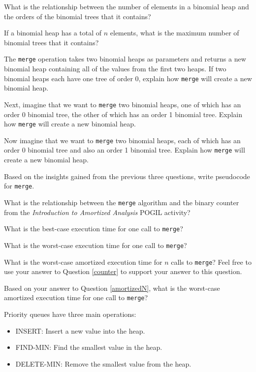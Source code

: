\documentclass{tufte-handout}
\begin{document}
\begin{questions}
\item What is the relationship between the number of elements in a binomial heap and the orders of the binomial trees that it contains?

\item If a binomial heap has a total of $n$ elements, what is the maximum number of binomial trees that it contains? 

\item The \verb|merge| operation takes two binomial heaps as parameters and returns a new binomial heap containing all of the values from the first two heaps. If two binomial heaps each have one tree of order 0, explain how \verb|merge| will create a new binomial heap.

\item Next, imagine that we want to \verb|merge| two binomial heaps, one of which has an order 0 binomial tree, the other of which has an order 1 binomial tree. Explain how \verb|merge| will create a new binomial heap.

\item Now imagine that we want to \verb|merge| two binomial heaps, each of which has an order 0 binomial tree and also an order 1 binomial tree. Explain how \verb|merge| will create a new binomial heap.

\item Based on the insights gained from the previous three questions, write pseudocode for \verb|merge|.

\item What is the relationship between the \verb|merge| algorithm and the binary counter from the \emph{Introduction to Amortized Analysis} POGIL activity? \label{counter}

\item What is the best-case execution time for one call to \verb|merge|?

\item What is the worst-case execution time for one call to \verb|merge|?

\item What is the worst-case amortized execution time for $n$ calls to \verb|merge|? Feel free to use your answer to Question \ref{counter} to support your answer to this question. \label{amortizedN}

\item Based on your answer to Question \ref{amortizedN}, what is the worst-case amortized execution time for one call to \verb|merge|?

\item Priority queues have three main operations:
\begin{itemize}
    \item INSERT: Insert a new value into the heap.
    \item FIND-MIN: Find the smallest value in the heap.
    \item DELETE-MIN: Remove the smallest value from the heap.
\end{itemize}


\end{questions}
\end{document}
